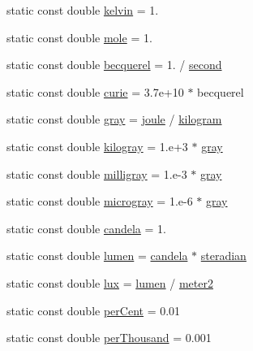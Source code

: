 \begin{DoxyCompactItemize}
\item 
static const double \hyperlink{namespacedd4hep_ae4984489719e11b38858934cc4c1e54e}{kelvin} = 1.
\item 
static const double \hyperlink{namespacedd4hep_a09193b4505440f7f2a58f02fbea9120f}{mole} = 1.
\item 
static const double \hyperlink{namespacedd4hep_a3c71f55bed97c3b05c92c0b81b3bb17e}{becquerel} = 1. / \hyperlink{namespacedd4hep_ac03364576705a245265d8ed6ea26b871}{second}
\item 
static const double \hyperlink{namespacedd4hep_a024c7af7439282d20567717fbdae08bb}{curie} = 3.7e+10 $\ast$ becquerel
\item 
static const double \hyperlink{namespacedd4hep_a35738d027f0d6649943f74cfc26bb7fc}{gray} = \hyperlink{namespacedd4hep_a8cdc11c61e5f953baede59569544a324}{joule} / \hyperlink{namespacedd4hep_a94c5d58440a5bf3d43b1edaa51ae5294}{kilogram}
\item 
static const double \hyperlink{namespacedd4hep_a865c3d39459c3a51f6ac00236482908a}{kilogray} = 1.e+3 $\ast$ \hyperlink{namespacedd4hep_a35738d027f0d6649943f74cfc26bb7fc}{gray}
\item 
static const double \hyperlink{namespacedd4hep_abc834abd0eb01594746cfdfd7b91104d}{milligray} = 1.e-\/3 $\ast$ \hyperlink{namespacedd4hep_a35738d027f0d6649943f74cfc26bb7fc}{gray}
\item 
static const double \hyperlink{namespacedd4hep_a3d5d57424aedb6753f4c4a9ad998b722}{microgray} = 1.e-\/6 $\ast$ \hyperlink{namespacedd4hep_a35738d027f0d6649943f74cfc26bb7fc}{gray}
\item 
static const double \hyperlink{namespacedd4hep_ad6c9a17d1f654cad2f47f590edc1bec4}{candela} = 1.
\item 
static const double \hyperlink{namespacedd4hep_aca4ed36739bef9c651a4ced5a2279b40}{lumen} = \hyperlink{namespacedd4hep_ad6c9a17d1f654cad2f47f590edc1bec4}{candela} $\ast$ \hyperlink{namespacedd4hep_a0a902cdeced2ad28da2d32515e540867}{steradian}
\item 
static const double \hyperlink{namespacedd4hep_a1c9daf57c558025c205072d26d477a99}{lux} = \hyperlink{namespacedd4hep_aca4ed36739bef9c651a4ced5a2279b40}{lumen} / \hyperlink{namespacedd4hep_afe718b0d811af6b4d45c556e3a0e87a3}{meter2}
\item 
static const double \hyperlink{namespacedd4hep_a403b2fd7b19ff0bf0a3803d7907bf84a}{perCent} = 0.01
\item 
static const double \hyperlink{namespacedd4hep_ab0f604563df4dec531bdb35bd2f97a6f}{perThousand} = 0.001

\end{DoxyCompactItemize}
